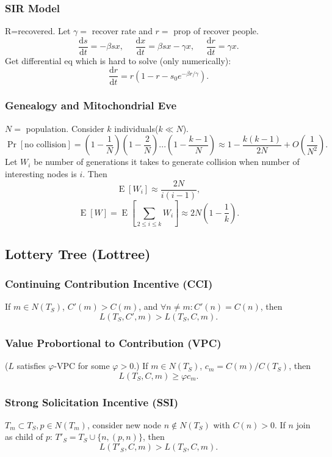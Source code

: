 \documentclass[a4paper,twocolumn,10pt]{article}
\newcommand{\pte}[1]{\left({#1}\right)}
\newcommand{\E}{\operatorname{E}}
\newcommand{\dd}{\mathrm{d}}
\begin{document}
	\subsubsection{SIR Model}
		R=recovered. Let $\gamma=$ recover rate and $r=$ prop of recover people.
		\[
			\frac{\dd s}{\dd t} = -\beta s x,
			\textrm{~~~~}
			\frac{\dd x}{\dd t} = \beta s x - \gamma x,
			\textrm{~~~~}
			\frac{\dd r}{\dd t} = \gamma x.
		\]
		Get differential eq which is hard to solve (only numerically):
		\[
			\frac{\dd r}{\dd t} =
				r\pte{1-r-s_0 e^{-\beta r/\gamma}}.
		\]

	\subsubsection{Genealogy and Mitochondrial Eve}
		$N=$ population. Consider $k$ individuals($k\ll N$).
		\[
		\Pr[\textrm{no collision}] = \pte{1-\frac{1}{N}} \pte{1-\frac{2}{N}}
		... \pte{1-\frac{k-1}{N}} \approx 1 - \frac{k(k-1)}{2N} + O\pte{\frac{1}{N^2}}.
		\]
		Let $W_i$ be number of generations it takes to generate collision when
			number of interesting nodes is $i$.
		Then
		\[
			\E[W_i]\approx \frac{2N}{i(i-1)},
		\]
		\[
			\E[W]=\E\left[\sum_{2\le i\le k} W_i\right]\approx 2N\pte{1-\frac{1}{k}}.
		\]

\subsection{Lottery Tree (Lottree)}
	\subsubsection{Continuing Contribution Incentive (CCI)}
		If $m\in N(T_S)$, $C'(m)>C(m)$,
		and $\forall n\neq m: C'(n)=C(n)$, then
		\[
			L(T_S,C',m)>L(T_S,C,m).
		\]
	\subsubsection{Value Probortional to Contribution (VPC)}
		($L$ satisfies $\varphi$-VPC for some $\varphi>0$.)
		If $m\in N(T_S)$, $c_m=C(m)/C(T_S)$, then
		\[
			L(T_S,C,m) \ge \varphi c_m.
		\]
	\subsubsection{Strong Solicitation Incentive (SSI)}
		$T_m\subset T_S, p\in N(T_m)$,
		consider new node $n\notin N(T_S)$ with $C(n)>0$.
		If $n$ join as child of $p$:
			$T'_S=T_S\cup\{n,(p,n)\}$,
		then
		\[
			L(T'_S,C,m) > L(T_S,C,m).
		\]
\end{document}
